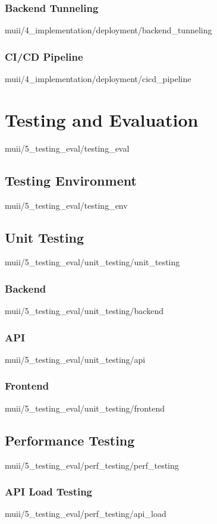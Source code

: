 \documentclass[english,epsbased,copyright,final,printable,covers,extendedindex,firstnumbered,tfm,gnuplot,loc,loe,lof,lot]{tfgtfmthesisuam}
\begin{document}
      \subsection{Backend Tunneling\label{SS:BACKTUNNEL}}{muii/4_implementation/deployment/backend_tunneling}
      \subsection{CI/CD Pipeline\label{SS:CICD}}{muii/4_implementation/deployment/cicd_pipeline}

  \chapter{Testing and Evaluation\label{CAP:TESTEVAL}}{muii/5_testing_eval/testing_eval}
    \section{Testing Environment\label{SEC:TESTENV}}{muii/5_testing_eval/testing_env}    
    
    \section{Unit Testing\label{SEC:UNITTEST}}{muii/5_testing_eval/unit_testing/unit_testing}
      \subsection{Backend\label{SS:BACKUNITTEST}}{muii/5_testing_eval/unit_testing/backend}
      \subsection{API\label{SS:APIUNITTEST}}{muii/5_testing_eval/unit_testing/api}
      \subsection{Frontend\label{SS:FRONTUNITTEST}}{muii/5_testing_eval/unit_testing/frontend}
    
    \section{Performance Testing\label{SEC:PERFORMANCETEST}}{muii/5_testing_eval/perf_testing/perf_testing}
      \subsection{API Load Testing\label{SS:APILAT}}{muii/5_testing_eval/perf_testing/api_load}
\end{document}
